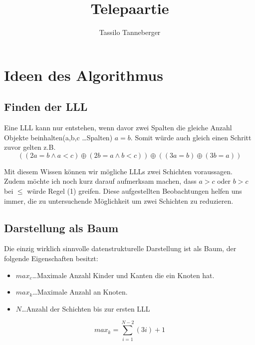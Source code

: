 \documentclass{article}
\begin{document}
\title{Telepaartie}
\author{Tassilo Tanneberger}

\maketitle

\section*{Ideen des Algorithmus}

\subsection*{ Finden der LLL}

Eine LLL kann nur entstehen, wenn davor zwei Spalten die gleiche Anzahl Objekte beinhalten(a,b,c \dots Spalten) \( a = b\). Somit würde auch gleich einen Schritt zuvor gelten z.B. 
\begin{equation}
	((2a = b \wedge a < c)  \oplus (2b = a \wedge b < c)) \oplus ((3a = b)  \oplus (3b = a))
\end{equation}

Mit diesem Wissen können wir mögliche LLLs zwei Schichten voraussagen. Zudem möchte ich noch kurz darauf aufmerksam machen, dass \(a>c\) oder \(b > c\) bei \( \leq \) würde Regel (1) greifen. Diese aufgestellten Beobachtungen helfen uns immer, die zu untersuchende Möglichkeit um zwei Schichten zu reduzieren.

\subsection*{ Darstellung als Baum}

Die einzig wirklich sinnvolle datenstrukturelle Darstellung ist als Baum, der folgende Eigenschaften besitzt: \newline

\begin{itemize}
	\item \(max_c\)\dots 				Maximale Anzahl Kinder und Kanten die ein Knoten hat.
	\item \(max_k\)\dots				Maximale Anzahl an Knoten. 
	\item \(N\)\dots    					Anzahl der Schichten bis zur ersten LLL
\end{itemize}

\begin{equation}
	max_k = \sum \limits_{i=1}^{N-2}(  3i) + 1
\end{equation}
\end{document}
